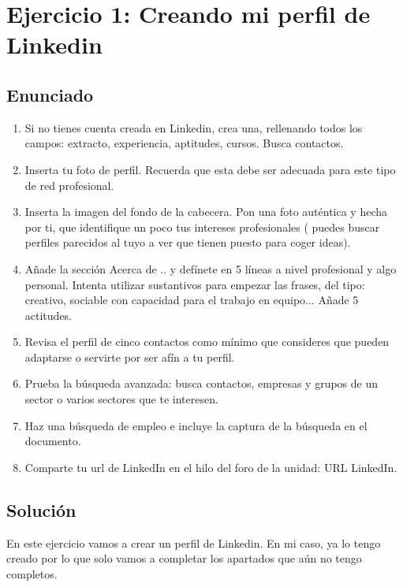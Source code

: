 \section{Ejercicio 1: Creando mi perfil de Linkedin}
\subsection{Enunciado}
\begin{enumerate}
    \item Si no tienes cuenta creada en Linkedin, crea una, rellenando todos los campos: extracto, experiencia, aptitudes, cursos. Busca contactos.
    \item Inserta tu foto de perfil. Recuerda que esta debe ser adecuada para este tipo de red profesional.
    \item Inserta la imagen del fondo de la cabecera. Pon una foto auténtica y hecha por ti, que identifique un poco tus intereses profesionales ( puedes buscar perfiles parecidos al tuyo a ver que tienen puesto para coger ideas).
    \item Añade la sección Acerca de .. y defínete en 5 líneas a nivel profesional y algo personal. Intenta utilizar sustantivos para empezar las frases, del tipo: creativo, sociable con capacidad para el trabajo en equipo... Añade 5 actitudes.
    \item Revisa el perfil de cinco contactos como mínimo que consideres que pueden adaptarse o servirte por ser afín a tu perfil.
    \item Prueba la búsqueda avanzada: busca contactos, empresas y grupos de un sector o varios sectores que te interesen.
    \item Haz una búsqueda de empleo e incluye la captura de la búsqueda en el documento.
    \item Comparte tu url de LinkedIn en el hilo del foro de la unidad: URL LinkedIn.
\end{enumerate}

\subsection{Solución}
En este ejercicio vamos a crear un perfil de Linkedin. En mi caso, ya lo tengo creado por lo que solo vamos a completar los apartados que aún no tengo completos.

